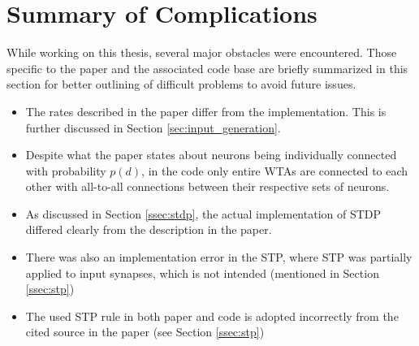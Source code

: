 \section{Summary of Complications} \label{sec:summary_complications_original}
While working on this thesis, several major obstacles were encountered. Those specific to the paper and the associated code base are briefly summarized in this section for better outlining of difficult problems to avoid future issues.
\begin{itemize}
    \item The rates described in the paper differ from the implementation. This is further discussed in Section \ref{sec:input_generation}.
    \item Despite what the paper states about neurons being individually connected with probability $p(d)$, in the code only entire WTAs are connected to each other with all-to-all connections between their respective sets of neurons.
    \item As discussed in Section \ref{ssec:stdp}, the actual implementation of STDP differed clearly from the description in the paper.
    \item There was also an implementation error in the STP, where STP was partially applied to input synapses, which is not intended (mentioned in Section \ref{ssec:stp})
    \item The used STP rule in both paper and code is adopted incorrectly from the cited source in the paper (see Section \ref{ssec:stp})
\end{itemize}



